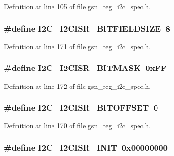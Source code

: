 Definition at line 105 of file gsn\_\-reg\_\-i2c\_\-spec.h.

\hypertarget{a00558_a488de08445809b9a505618173219c6d7}{
\subsubsection[{I2C\_\-I2CISR\_\-BITFIELDSIZE}]{\setlength{\rightskip}{0pt plus 5cm}\#define I2C\_\-I2CISR\_\-BITFIELDSIZE~8}}
\label{a00558_a488de08445809b9a505618173219c6d7}


Definition at line 171 of file gsn\_\-reg\_\-i2c\_\-spec.h.

\hypertarget{a00558_aedea73401ef26408a227607b854309ce}{
\subsubsection[{I2C\_\-I2CISR\_\-BITMASK}]{\setlength{\rightskip}{0pt plus 5cm}\#define I2C\_\-I2CISR\_\-BITMASK~0xFF}}
\label{a00558_aedea73401ef26408a227607b854309ce}


Definition at line 172 of file gsn\_\-reg\_\-i2c\_\-spec.h.

\hypertarget{a00558_a0e2c77ccfccd6d7e9c617cc868c12c23}{
\subsubsection[{I2C\_\-I2CISR\_\-BITOFFSET}]{\setlength{\rightskip}{0pt plus 5cm}\#define I2C\_\-I2CISR\_\-BITOFFSET~0}}
\label{a00558_a0e2c77ccfccd6d7e9c617cc868c12c23}


Definition at line 170 of file gsn\_\-reg\_\-i2c\_\-spec.h.

\hypertarget{a00558_a284d29d73a13300383717e8333a71cd0}{
\subsubsection[{I2C\_\-I2CISR\_\-INIT}]{\setlength{\rightskip}{0pt plus 5cm}\#define I2C\_\-I2CISR\_\-INIT~0x00000000}}
\label{a00558_a284d29d73a13300383717e8333a71cd0}


